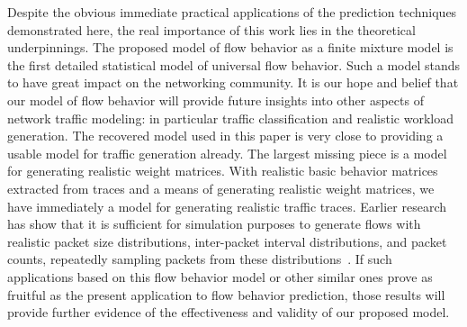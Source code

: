 \documentclass{acm_proc_article-sp}
\begin{document}
Despite the obvious immediate practical applications of the prediction techniques demonstrated here, the real importance of this work lies in the theoretical underpinnings.
The proposed model of flow behavior as a finite mixture model is the first detailed statistical model of universal flow behavior.
Such a model stands to have great impact on the networking community.
It is our hope and belief that our model of flow behavior will provide future insights into other aspects of network traffic modeling:
in particular traffic classification and realistic workload generation.
The recovered model used in this paper is very close to providing a usable model for traffic generation already.
The largest missing piece is a model for generating realistic weight matrices.
With realistic basic behavior matrices extracted from traces and a means of generating realistic weight matrices, we have immediately a model for generating realistic traffic traces.
Earlier research has show that it is sufficient for simulation purposes to generate flows with realistic packet size distributions, inter-packet interval distributions, and packet counts, repeatedly sampling packets from these distributions~\cite{Karpinski07:realism,Karpinski07:cbr-failure}.
If such applications based on this flow behavior model or other similar ones prove as fruitful as the present application to flow behavior prediction, those results will provide further evidence of the effectiveness and validity of our proposed model.


\vfill
\pagebreak

\small

\end{document}
